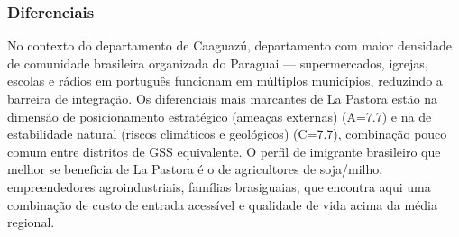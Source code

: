 \subsubsection*{Diferenciais}\label{dif-la-pastora-0517}
No contexto do departamento de Caaguazú, departamento com maior densidade de comunidade brasileira organizada do Paraguai — supermercados, igrejas, escolas e rádios em português funcionam em múltiplos municípios, reduzindo a barreira de integração. Os diferenciais mais marcantes de La Pastora estão na dimensão de posicionamento estratégico (ameaças externas) (A=7.7) e na de estabilidade natural (riscos climáticos e geológicos) (C=7.7), combinação pouco comum entre distritos de GSS equivalente. O perfil de imigrante brasileiro que melhor se beneficia de La Pastora é o de agricultores de soja/milho, empreendedores agroindustriais, famílias brasiguaias, que encontra aqui uma combinação de custo de entrada acessível e qualidade de vida acima da média regional.
